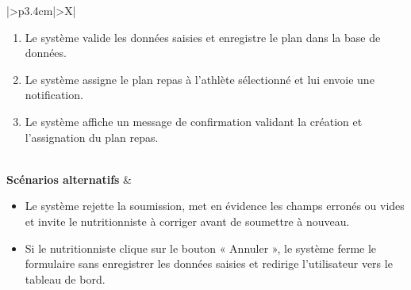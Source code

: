 ﻿\documentclass[a4paper,12pt]{report}
\begin{document}
\begin{table}[H]
\begin{tabularx}{\textwidth}{|>{\RaggedRight\arraybackslash}p{3.4cm}|>{\RaggedRight\arraybackslash}X|}
\begin{minipage}[t]{\linewidth}
\begin{enumerate}[label=\arabic*., leftmargin=*, topsep=0pt, itemsep=1pt]
    \item Le système valide les données saisies et enregistre le plan dans la base de données.
    \item Le système assigne le plan repas à l'athlète sélectionné et lui envoie une notification.
    \item Le système affiche un message de confirmation validant la création et l'assignation du plan repas.
\end{enumerate}
\vspace{2pt}
\end{minipage} \\
\hline
\textbf{Scénarios alternatifs} &
\begin{minipage}[t]{\linewidth}
\vspace{2pt}
\begin{itemize}[leftmargin=*, topsep=0pt, itemsep=1pt]
    \item  Le système rejette la soumission, met en évidence les champs erronés ou vides  et invite le nutritionniste à corriger avant de soumettre à nouveau.
    \item  Si le nutritionniste clique sur le bouton « Annuler », le système ferme le formulaire sans enregistrer les données saisies et redirige l’utilisateur vers le tableau de bord.
\end{itemize}
\vspace{2pt}
\end{minipage} \\
\hline
\end{tabularx}
\fussy
\end{table}
\end{document}
